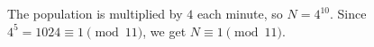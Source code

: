 The population is multiplied by $4$ each minute, so $N=4^{10}$. Since $4^5=1024\equiv1\pmod{11}$, we get $N\equiv\boxed1\pmod{11}$.
